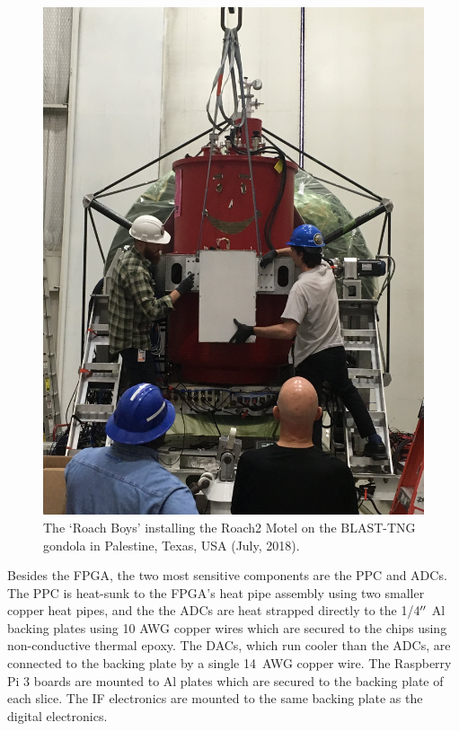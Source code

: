 \begin{figure}[!htbp]
\centering
\includegraphics[width=\textwidth]{figures/readout/hardware/installing_roaches}
\caption{The `Roach Boys' installing the Roach2 Motel on the BLAST-TNG gondola in Palestine, Texas, USA (July, 2018).}
\label{fig:mounting roaches}
\end{figure}

Besides the FPGA, the two most sensitive components are the PPC and ADCs. The PPC is heat-sunk to the FPGA's heat pipe assembly using two smaller copper heat pipes, and the the ADCs are heat strapped directly to the 1/4$\operatorname{^{\prime\prime}}$ Al backing plates using 10 AWG copper wires which are secured to the chips using non-conductive thermal epoxy. The DACs, which run cooler than the ADCs, are connected to the backing plate by a single 14~AWG copper wire. The Raspberry Pi 3 boards are mounted to Al plates which are secured to the backing plate of each slice. The IF electronics are mounted to the same backing plate as the digital electronics.

